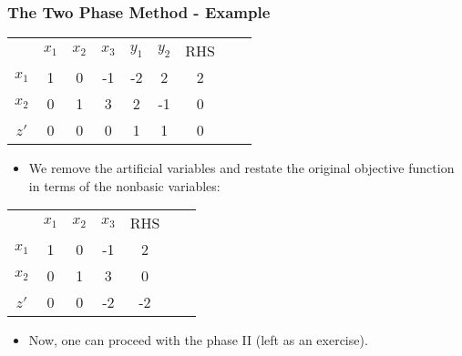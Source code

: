 \documentclass{beamer}
\theoremstyle{plain}
\begin{document}
\begin{frame}\frametitle{The Two Phase Method - Example}
\justifying

\begin{center}
\vspace{-0.3cm}
\begin{tabular}{c|ccccc|ccc}	
& $ x_1 $ & $ x_2 $ & $ x_3 $ & $y_1 $ & $ y_2 $  &{\tiny RHS}  && \\
\cline{1-7}
$ x_1 $ & 1 & 0 & -1 & -2 &  2 & 2 & & \\
$ x_2 $ & 0 & 1 & 3 & 2  & -1 & 0 & & \\
\cline{1-7}	
$ z' $ & 0 & 0 & 0 & 1 & 1  & 0  & & \\
\end{tabular}
\end{center}

\begin{itemize}
\justifying

\item We remove the artificial variables and restate the original objective function in terms of the nonbasic variables:

\end{itemize}

\begin{center}
\vspace{-0.3cm}
\begin{tabular}{c|ccc|ccc}	
& $ x_1 $ & $ x_2 $ & $ x_3 $ & {\tiny RHS}  && \\
\cline{1-5}
$ x_1 $ & 1 & 0 & -1 & 2 & & \\
$ x_2 $ & 0 & 1 & 3 &  0 & & \\
\cline{1-5}	
$ z' $ & 0 & 0 & -2 &  -2 & & \\
\end{tabular}
\end{center}

\begin{itemize}
\justifying

\item Now, one can proceed with the phase II (left as an exercise).

\end{itemize}

\end{frame}
\end{document}
